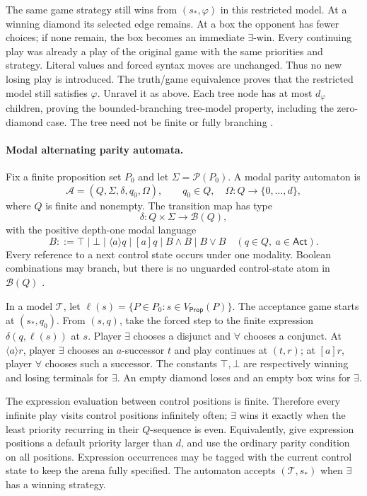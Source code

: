 The same game strategy still wins
from \((s_*,\varphi)\) in this
restricted model. At a winning
diamond its selected edge remains.
At a box the opponent has fewer
choices; if none remain, the box
becomes an immediate \(\exists\)-win.
Every continuing play was already
a play of the original game with
the same priorities and strategy.
Literal values and forced syntax
moves are unchanged. Thus no new
losing play is introduced.
The truth/game equivalence proves
that the restricted model still
satisfies \(\varphi\).
Unravel it as above. Each tree
node has at most \(d_\varphi\)
children, proving the bounded-branching
tree-model property, including
the zero-diamond case. The tree
need not be finite or fully
branching \cite[\S4.2, prop.~4.4]{BradfieldStirling2007}.

\paragraph{Modal alternating parity automata.}
\label{sec:p09-modal-parity-automata}
Fix a finite proposition set \(P_0\) and let
\(\Sigma=\mathcal P(P_0)\). A modal parity automaton is
\[
 \mathcal A=(Q,\Sigma,\delta,q_0,\Omega),
 \qquad q_0\in Q,\quad
 \Omega:Q\to\{0,\ldots,d\},
\]
where \(Q\) is finite and nonempty.
The transition map has type
\[
 \delta:Q\times\Sigma\to\mathcal B(Q),
\]
with the positive depth-one modal language
\[
 B::=\top\mid\bot\mid
       \langle a\rangle q\mid[a]q
       \mid B\land B\mid B\lor B
       \quad(q\in Q,\ a\in\mathsf{Act}).
\]
Every reference to a next control state occurs under
one modality. Boolean combinations may branch, but
there is no unguarded control-state atom in
\(\mathcal B(Q)\)
\cite[\S5.3]{BradfieldStirling2007}.

In a model \(\mathcal T\), let
\(\ell(s)=\{P\in P_0:s\in V_{\mathsf{Prop}}(P)\}\).
The acceptance game starts at \((s_*,q_0)\).
From \((s,q)\), take the forced step to the finite
expression \(\delta(q,\ell(s))\) at \(s\).
Player \(\exists\) chooses a disjunct and
\(\forall\) chooses a conjunct.
At \(\langle a\rangle r\), player \(\exists\)
chooses an \(a\)-successor \(t\) and play continues
at \((t,r)\); at \([a]r\), player \(\forall\)
chooses such a successor.
The constants \(\top,\bot\) are respectively
winning and losing terminals for \(\exists\).
An empty diamond loses and an empty box wins
for \(\exists\).

The expression evaluation between control
positions is finite. Therefore every infinite
play visits control positions infinitely often;
\(\exists\) wins it exactly when the least
priority recurring in their \(Q\)-sequence
is even. Equivalently, give expression positions
a default priority larger than \(d\), and use
the ordinary parity condition on all positions.
Expression occurrences may be tagged with the
current control state to keep the arena fully
specified. The automaton accepts
\((\mathcal T,s_*)\) when \(\exists\) has a
winning strategy.

